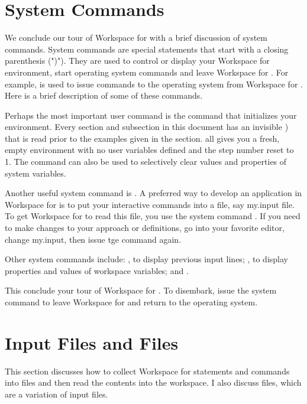  \section{System Commands}

We conclude our tour of Workspace for \nr{} with a brief discussion of system commands. System commands are special statements that start with a closing parenthesis (")"). They are used to control or display your Workspace for \nr{} environment, start operating system commands and leave Workspace for \nr{}. For example,  is used to issue commands to the operating system from Workspace for \nr{}. Here is a brief description of some of these commands.

Perhaps the most important user command is the  command that initializes your environment. Every section and subsection in this document has an invisible ) that is read prior to the examples given in the section.  all gives you a fresh, empty environment with no user variables defined and the step number reset to 1. The  command can also be used to selectively clear values and properties of system variables.

Another useful system command is . A preferred way to
develop an application in Workspace for \nr{} is to put your
interactive commands into a file, say my.input file. To get Workspace
for \nr{} to read this file, you use the system command . If you need to make changes to your approach or
definitions, go into your favorite editor, change my.input, then issue
tge command again.

Other system commands include: , to display previous input lines; , to display properties and values of workspace variables; and .

This conclude your tour of Workspace for \nr{}. To disembark, issue the system command  to leave Workspace for \nr{} and return to the operating system.

\section{Input Files and \nr{} Files}

This section discusses how to collect Workspace for \nr{} statements and commands into files and then read the contents into the workspace. I also discuss \nr{} files, which are a variation of input files.

